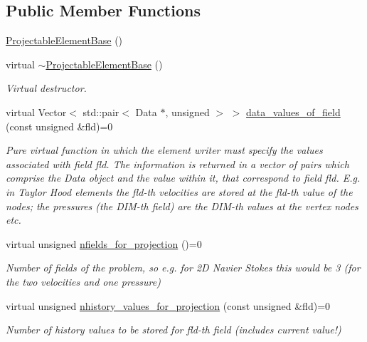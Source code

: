 \subsection*{Public Member Functions}
\begin{DoxyCompactItemize}
\item 
\hyperlink{classoomph_1_1ProjectableElementBase_a7ee05f9195757b46b3693786cd260ac5}{Projectable\+Element\+Base} ()
\item 
virtual \hyperlink{classoomph_1_1ProjectableElementBase_a668500db9bcaab7aa983d3c92f94e34b}{$\sim$\+Projectable\+Element\+Base} ()
\begin{DoxyCompactList}\small\item\em Virtual destructor. \end{DoxyCompactList}\item 
virtual Vector$<$ std\+::pair$<$ Data $\ast$, unsigned $>$ $>$ \hyperlink{classoomph_1_1ProjectableElementBase_a644306ebdf16f334344c2d27d72f18b7}{data\+\_\+values\+\_\+of\+\_\+field} (const unsigned \&fld)=0
\begin{DoxyCompactList}\small\item\em Pure virtual function in which the element writer must specify the values associated with field fld. The information is returned in a vector of pairs which comprise the Data object and the value within it, that correspond to field fld. E.\+g. in Taylor Hood elements the fld-\/th velocities are stored at the fld-\/th value of the nodes; the pressures (the D\+I\+M-\/th field) are the D\+I\+M-\/th values at the vertex nodes etc. \end{DoxyCompactList}\item 
virtual unsigned \hyperlink{classoomph_1_1ProjectableElementBase_a44634aa4049332a580d249c25564638c}{nfields\+\_\+for\+\_\+projection} ()=0
\begin{DoxyCompactList}\small\item\em Number of fields of the problem, so e.\+g. for 2D Navier Stokes this would be 3 (for the two velocities and one pressure) \end{DoxyCompactList}\item 
virtual unsigned \hyperlink{classoomph_1_1ProjectableElementBase_ac6790f394630b964663281f8740f43a5}{nhistory\+\_\+values\+\_\+for\+\_\+projection} (const unsigned \&fld)=0
\begin{DoxyCompactList}\small\item\em Number of history values to be stored for fld-\/th field (includes current value!) \end{DoxyCompactList}\item 

\end{DoxyCompactItemize}
